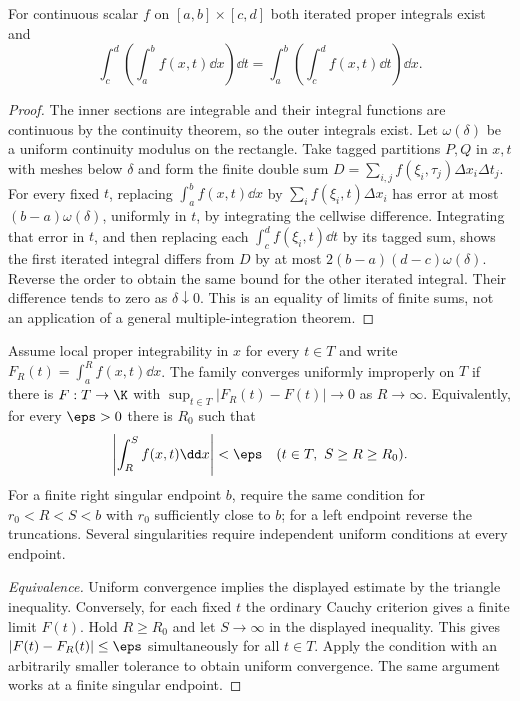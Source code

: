 \begin{theorem}
For continuous scalar $f$ on $[a,b]\times[c,d]$ both iterated proper
integrals exist and
\[\int_c^d\left(\int_a^bf(x,t)\dd x\right)\dd t
=\int_a^b\left(\int_c^df(x,t)\dd t\right)\dd x.
\]
\end{theorem}
\begin{proof}
The inner sections are integrable and their integral functions are
continuous by the continuity theorem, so the outer integrals exist.
Let $\omega(\delta)$ be a uniform continuity modulus on the rectangle.
Take tagged partitions $P,Q$ in $x,t$ with meshes below $\delta$ and
form the finite double sum
$D=\sum_{i,j}f(\xi_i,\tau_j)\Delta x_i\Delta t_j$.
For every fixed $t$, replacing $\int_a^bf(x,t)\dd x$ by
$\sum_i f(\xi_i,t)\Delta x_i$ has error at most
$(b-a)\omega(\delta)$, uniformly in $t$, by integrating the
cellwise difference. Integrating that error in $t$, and then replacing
each $\int_c^df(\xi_i,t)\dd t$ by its tagged sum, shows the first
iterated integral differs from $D$ by at most
$2(b-a)(d-c)\omega(\delta)$. Reverse the order to obtain the same
bound for the other iterated integral. Their difference tends to zero
as $\delta\downarrow0$. This is an equality of limits of finite sums,
not an application of a general multiple-integration theorem.
\end{proof}

\begin{definition}
Assume local proper integrability in $x$ for every $t\in T$ and write
$F_R(t)=\int_a^Rf(x,t)\dd x$. The family converges uniformly
improperly on $T$ if there is $F:T\to\K$ with
$\sup_{t\in T}|F_R(t)-F(t)|\to0$ as $R\to\infty$.
Equivalently, for every $\eps>0$ there is $R_0$ such that
\[\left|\int_R^Sf(x,t)\dd x\right|<\eps
\quad(t\in T,\ S\ge R\ge R_0).
\]
For a finite right singular endpoint $b$, require the same condition
for $r_0<R<S<b$ with $r_0$ sufficiently close to $b$; for a left
endpoint reverse the truncations. Several singularities require
independent uniform conditions at every endpoint.
\end{definition}
\begin{proof}[Equivalence]
Uniform convergence implies the displayed estimate by the triangle
inequality. Conversely, for each fixed $t$ the ordinary Cauchy criterion
gives a finite limit $F(t)$. Hold $R\ge R_0$ and let $S\to\infty$
in the displayed inequality. This gives $|F(t)-F_R(t)|\le\eps$
simultaneously for all $t\in T$. Apply the condition with an arbitrarily
smaller tolerance to obtain uniform convergence. The same argument works
at a finite singular endpoint.
\end{proof}


